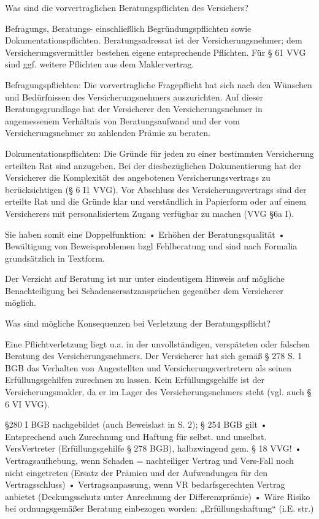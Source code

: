 Was sind die vorvertraglichen Beratungspflichten des Versichers?

Befragungs, Beratungs- einschließlich Begründungspflichten sowie Dokumentationspflichten. 
Beratungsadressat ist der Versicherungsnehmer; 
dem Versicherungsvermittler bestehen eigene entsprechende Pflichten. Für § 61 VVG sind ggf. weitere Pflichten aus dem Maklervertrag.

Befragungspflichten:
Die vorvertragliche Fragepflicht hat sich nach den Wünschen und Bedürfnissen des Versicherungsnehmers auszurichten. 
Auf dieser Beratungsgrundlage hat der Versicherer den Versicherungsnehmer in angemessenem Verhältnis von Beratungsaufwand und der vom 
Versicherungsnehmer zu zahlenden Prämie zu beraten. 

Dokumentationspflichten:
Die Gründe für jeden zu einer bestimmten Versicherung erteilten Rat sind anzugeben. 
Bei der diesbezüglichen Dokumentierung hat der Versicherer die Komplexität des angebotenen Versicherungsvertrags zu berücksichtigen (§ 6 I1 VVG). 
Vor Abschluss des Versicherungsvertrags sind der erteilte Rat und die Gründe klar und verständlich in Papierform oder auf einem Versicherers mit 
personalisiertem Zugang verfügbar zu machen (VVG §6a I).

Sie haben somit eine Doppelfunktion:
• Erhöhen der Beratungsqualität
• Bewältigung von Beweisproblemen bzgl Fehlberatung
und sind nach Formalia grundsätzlich in Textform.

Der Verzicht auf Beratung ist nur unter eindeutigem Hinweis auf mögliche Benachteiligung bei Schadensersatzansprüchen gegenüber dem Versicherer
möglich.


Was sind mögliche Konsequenzen bei Verletzung der Beratungspflicht?

Eine Pflichtverletzung liegt u.a. in der unvollständigen, verspäteten oder falschen Beratung des Versicherungsnehmers. 
Der Versicherer hat sich gemäß § 278 S. 1 BGB das Verhalten von Angestellten und Versicherungsvertretern als seinen Erfüllungsgehilfen zurechnen zu lassen. 
Kein Erfüllungsgehilfe ist der Versicherungsmakler, da er im Lager des Versicherungsnehmers steht (vgl. auch § 6 VI VVG). 

§280 I BGB nachgebildet (auch Beweislast in S. 2); § 254 BGB gilt
• Entsprechend auch Zurechnung und Haftung für selbst. und unselbst. VersVertreter
(Erfüllungsgehilfe § 278 BGB), halbzwingend gem. § 18 VVG!
• Vertragsaufhebung, wenn Schaden = nachteiliger Vertrag und Vers-Fall noch nicht
eingetreten (Ersatz der Prämien und der Aufwendungen für den Vertragsschluss)
• Vertragsanpassung, wenn VR bedarfsgerechten Vertrag anbietet (Deckungsschutz
unter Anrechnung der Differenzprämie)
• Wäre Risiko bei ordnungsgemäßer Beratung einbezogen worden:
„Erfüllungshaftung“ (i.E. str.)

